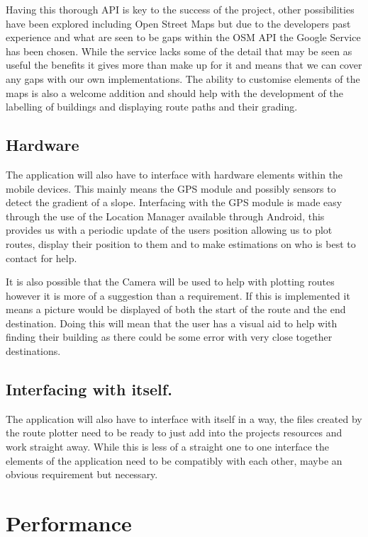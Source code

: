 Having this thorough API is key to the success of the project, other possibilities have been explored including Open Street Maps but due to the developers past experience and what are seen to be gaps within the OSM API the Google Service has been chosen. While the service lacks some of the detail that may be seen as useful the benefits it gives more than make up for it and means that we can cover any gaps with our own implementations. The ability to customise elements of the maps is also a welcome addition and should help with the development of the labelling of buildings and displaying route paths and their grading. 
\subsection{Hardware}
The application will also have to interface with hardware elements within the mobile devices. This mainly means the GPS module and possibly sensors to detect the gradient of a slope. Interfacing with the GPS module is made easy through the use of the Location Manager available through Android, this provides us with a periodic update of the users position allowing us to plot routes, display their position to them and to make estimations on who is best to contact for help.

It is also possible that the Camera will be used to help with plotting routes however it is more of a suggestion than a requirement. If this is implemented it means a picture would be displayed of both the start of the route and the end destination. Doing this will mean that the user has a visual aid to help with finding their building as there could be some error with very close together destinations. 
\subsection{Interfacing with itself.}
The application will also have to interface with itself in a way, the files created by the route plotter need to be ready to just add into the projects resources and work straight away. While this is less of a straight one to one interface the elements of the application need to be compatibly with each other, maybe an obvious requirement but necessary. 

\section{Performance}
